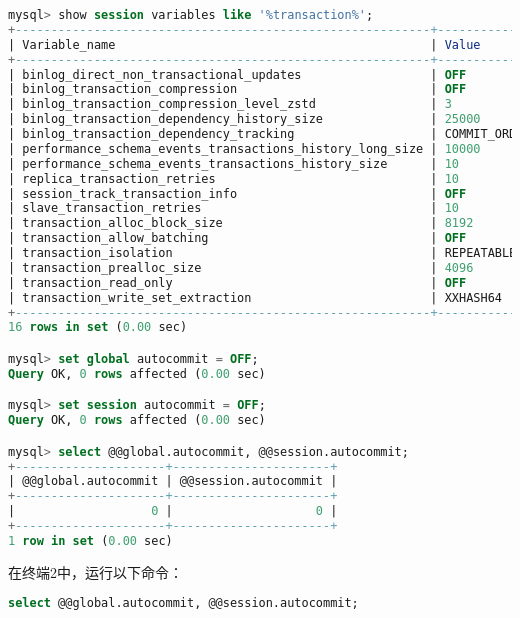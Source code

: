 \documentclass{article}
\begin{document}
\begin{lstlisting}[language=sql]
mysql> show session variables like '%transaction%';
+----------------------------------------------------------+-----------------+
| Variable_name                                            | Value           |
+----------------------------------------------------------+-----------------+
| binlog_direct_non_transactional_updates                  | OFF             |
| binlog_transaction_compression                           | OFF             |
| binlog_transaction_compression_level_zstd                | 3               |
| binlog_transaction_dependency_history_size               | 25000           |
| binlog_transaction_dependency_tracking                   | COMMIT_ORDER    |
| performance_schema_events_transactions_history_long_size | 10000           |
| performance_schema_events_transactions_history_size      | 10              |
| replica_transaction_retries                              | 10              |
| session_track_transaction_info                           | OFF             |
| slave_transaction_retries                                | 10              |
| transaction_alloc_block_size                             | 8192            |
| transaction_allow_batching                               | OFF             |
| transaction_isolation                                    | REPEATABLE-READ |
| transaction_prealloc_size                                | 4096            |
| transaction_read_only                                    | OFF             |
| transaction_write_set_extraction                         | XXHASH64        |
+----------------------------------------------------------+-----------------+
16 rows in set (0.00 sec)

mysql> set global autocommit = OFF;
Query OK, 0 rows affected (0.00 sec)

mysql> set session autocommit = OFF;
Query OK, 0 rows affected (0.00 sec)

mysql> select @@global.autocommit, @@session.autocommit;
+---------------------+----------------------+
| @@global.autocommit | @@session.autocommit |
+---------------------+----------------------+
|                   0 |                    0 |
+---------------------+----------------------+
1 row in set (0.00 sec)
\end{lstlisting}

在终端2中，运行以下命令：

\begin{lstlisting}[language=sql]
select @@global.autocommit, @@session.autocommit;
\end{lstlisting}
\end{document}
